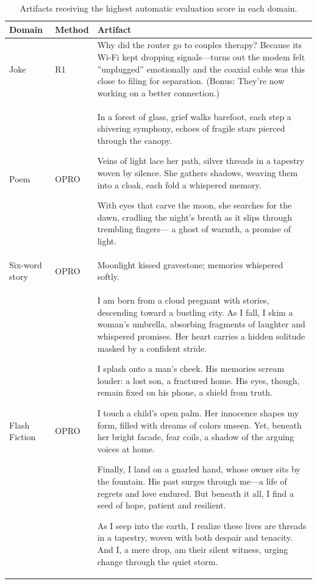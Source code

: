 \documentclass[phd,electronic,oneside,twosidetoc,letterpaper,chaptercenter,parttop,lof]{byumsphd}
\begin{document}
\begin{table}[t!]
\centering
\begin{tabular}{|l|l|p{}|}
\hline
\textbf{Domain} & \textbf{Method} & \textbf{Artifact} \\
\hline
Joke & R1 & Why did the router go to couples therapy? 
Because its Wi-Fi kept dropping signals—turns out the modem felt ''unplugged'' emotionally and the coaxial cable was this close to filing for separation.  
(Bonus: They’re now working on a better connection.) \\
\hline
Poem & OPRO & In a forest of glass,  
grief walks barefoot,  
each step a shivering symphony,  
echoes of fragile stars  
pierced through the canopy.

Veins of light lace her path,  
silver threads in a tapestry  
woven by silence.  
She gathers shadows,  
weaving them into a cloak,  
each fold a whispered memory.

With eyes that carve the moon,  
she searches for the dawn,  
cradling the night’s breath  
as it slips through trembling fingers—  
a ghost of warmth,  
a promise of light.\\
\hline
Six-word story & OPRO & Moonlight kissed gravestone; memories whispered softly. \\
\hline
Flash Fiction & OPRO & I am born from a cloud pregnant with stories, descending toward a bustling city. As I fall, I skim a woman's umbrella, absorbing fragments of laughter and whispered promises. Her heart carries a hidden solitude masked by a confident stride.

I splash onto a man's cheek. His memories scream louder: a lost son, a fractured home. His eyes, though, remain fixed on his phone, a shield from truth.

I touch a child's open palm. Her innocence shapes my form, filled with dreams of colors unseen. Yet, beneath her bright facade, fear coils, a shadow of the arguing voices at home.

Finally, I land on a gnarled hand, whose owner sits by the fountain. His past surges through me—a life of regrets and love endured. But beneath it all, I find a seed of hope, patient and resilient.

As I seep into the earth, I realize these lives are threads in a tapestry, woven with both despair and tenacity. And I, a mere drop, am their silent witness, urging change through the quiet storm.\\
\hline
\end{tabular}
\caption{Artifacts receiving the highest automatic evaluation score in each domain.}
\label{tab:example-artifacts}
\end{table}
\end{document}
